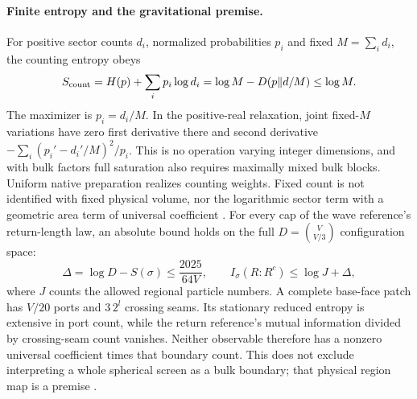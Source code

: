 \documentclass[11pt]{article}
\theoremstyle{definition}
\theoremstyle{remark}
\theoremstyle{plain}
\begin{document}
\paragraph{Finite entropy and the gravitational premise.}
For positive sector counts $d_i$, normalized probabilities $p_i$ and fixed
$M=\sum_i d_i$, the counting entropy obeys
\[
 S_{\rm count}=H(p)+\sum_i p_i\log d_i
 =\log M-D(p\|d/M)\le\log M.
\]
The maximizer is $p_i=d_i/M$. In the positive-real relaxation, joint
fixed-$M$ variations have zero first derivative there and second derivative
$-\sum_i(p_i'-d_i'/M)^2/p_i$. This is no operation varying integer
dimensions, and with bulk factors full saturation also requires maximally
mixed bulk blocks. Uniform native preparation realizes counting weights.
Fixed count is not identified with fixed physical volume, nor the
logarithmic sector term with a geometric area term of universal coefficient
\cite{nativeEntropy}.
For every cap of the wave reference's return-length law, an absolute bound
holds on the full
$D=\binom{V}{V/3}$ configuration space:
\[
 \Delta=\log D-S(\sigma)\le\frac{2025}{64V},\qquad
 I_\sigma(R:R^c)\le\log J+\Delta,
\]
where $J$ counts the allowed regional particle numbers. A complete base-face
patch has $V/20$ ports and $3\,2^l$ crossing seams. Its stationary reduced
entropy is extensive in port count, while the return reference's mutual
information divided by crossing-seam count vanishes. Neither observable
therefore has a nonzero universal coefficient times that boundary count.
This does not exclude interpreting a whole spherical screen as a bulk
boundary; that physical region map is a premise \cite{nativeEntropy}.
\end{document}
